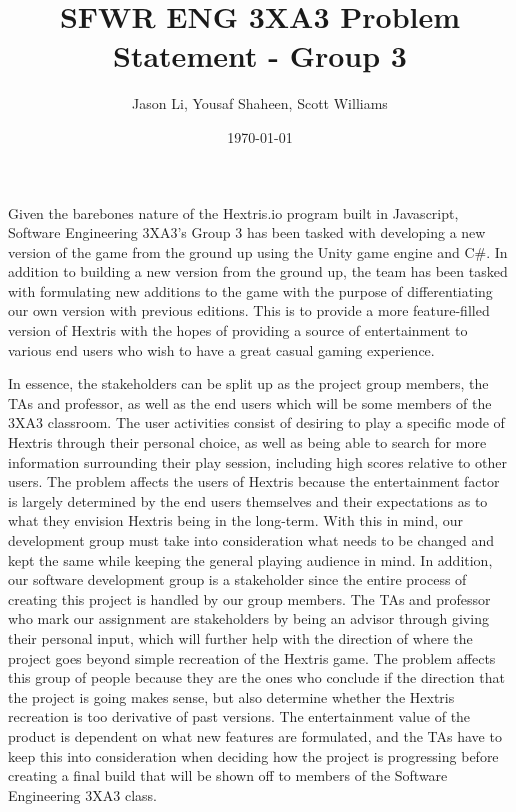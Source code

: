 \documentclass[12pt]{article}
\begin{document}
 
	\title{SFWR ENG 3XA3 Problem Statement - Group 3}
	\date{\today}
	\author{Jason Li, Yousaf Shaheen, Scott Williams}
	\maketitle
	\newpage


\newpage

Given the barebones nature of the Hextris.io program built in Javascript, Software Engineering 3XA3's Group 3 has been tasked with developing a new version of the game from the ground up using the Unity game engine and C\#. In addition to building a new version from the ground up, the team has been tasked with formulating new additions to the game with the purpose of differentiating our own version with previous editions. This is to provide a more feature-filled version of Hextris with the hopes of providing a source of entertainment to various end users who wish to have a great casual gaming experience. 

In essence, the stakeholders can be split up as the project group members, the TAs and professor, as well as the end users which will  be some members of the 3XA3 classroom. The user activities consist of desiring to play a specific mode of Hextris through their personal choice, as well as being able to search for more information surrounding their play session, including high scores relative to other users. The problem affects the users of Hextris because the entertainment factor is largely determined by the end users themselves and their expectations as to what they envision Hextris being in the long-term. With this in mind, our development group must take into consideration what needs to be changed and kept the same while keeping the general playing audience in mind. In addition, our software development group is a stakeholder since the entire process of creating this project is handled by our group members. The TAs and professor who mark our assignment are stakeholders by being an advisor through giving their personal input, which will further help with the direction of where the project goes beyond simple recreation of the Hextris game. The problem affects this group of people because they are the ones who conclude if the direction that the project is going makes sense, but also determine whether the Hextris recreation is too derivative of past versions. The entertainment value of the product is dependent on what new features are formulated, and the TAs have to keep this into consideration when deciding how the project is progressing before creating a final build that will be shown off to members of the Software Engineering 3XA3 class.
\end{document}
